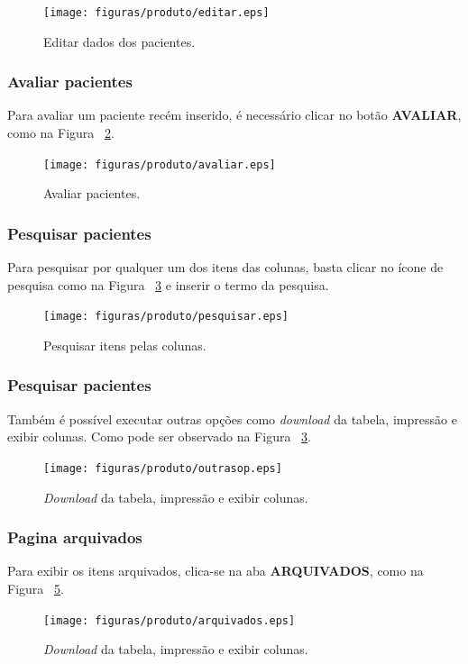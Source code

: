 \begin{figure}[!htb]
    \centering
    \texttt{[image: figuras/produto/editar.eps]}
    \caption{Editar dados dos pacientes.}
    \label{figeditar}
\end{figure}

\subsubsection{Avaliar pacientes}
Para avaliar um paciente recém inserido, é necessário clicar no botão \textbf{AVALIAR}, como na Figura ~\ref{figavaliar}.
\begin{figure}[!htb]
    \centering
    \texttt{[image: figuras/produto/avaliar.eps]}
    \caption{Avaliar pacientes.}
    \label{figavaliar}
\end{figure}

\subsubsection{Pesquisar pacientes}
Para pesquisar por qualquer um dos itens das colunas, basta clicar no ícone de pesquisa como na Figura ~\ref{figpesquisar} e inserir o termo da pesquisa.
\begin{figure}[!htb]
    \centering
    \texttt{[image: figuras/produto/pesquisar.eps]}
    \caption{Pesquisar itens pelas colunas.}
    \label{figpesquisar}
\end{figure}

\subsubsection{Pesquisar pacientes}
Também é possível executar outras opções como \textit{download} da tabela, impressão e exibir colunas. Como pode ser observado na Figura ~\ref{figpesquisar}.
\begin{figure}[!htb]
    \centering
    \texttt{[image: figuras/produto/outrasop.eps]}
    \caption{\textit{Download} da tabela, impressão e exibir colunas.}
    \label{figoutrasop}
\end{figure}

\subsubsection{Pagina arquivados}
Para exibir os itens arquivados, clica-se na aba \textbf{ARQUIVADOS}, como na Figura ~\ref{farquivados}.
\begin{figure}[!htb]
    \centering
    \texttt{[image: figuras/produto/arquivados.eps]}
    \caption{\textit{Download} da tabela, impressão e exibir colunas.}
    \label{farquivados}
\end{figure}

